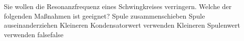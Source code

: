     {Sie wollen die Resonanzfrequenz eines Schwingkreises verringern. Welche der folgenden Maßnahmen ist geeignet?}
    {Spule zusammenschieben}
    {Spule auseinanderziehen}
    {Kleineren Kondensatorwert verwenden}
    {Kleineren Spulenwert verwenden}
    {false}{false}